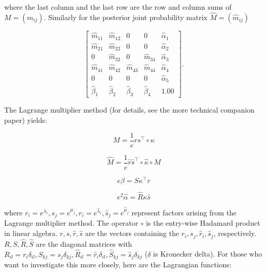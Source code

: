 \documentclass[12pt]{article}
\begin{document}
where the last column and the last row are the row and column sums of
$M=(m_{ij})$. Similarly for the posterior joint probability matrix
$\hat{M}=(\hat{m}_{ij})$

\begin{equation}
  \label{eq:p6}
      \left[
      \begin{array}{ccccc}
        \hat{m}_{11} & \hat{m}_{12} & 0 & 0 & \hat{\alpha}_{1} \\
        \hat{m}_{21} & \hat{m}_{22} & 0 & 0 & \hat{\alpha}_{2} \\
        0 & \hat{m}_{32} & 0 & \hat{m}_{34} & \hat{\alpha}_{3} \\
        \hat{m}_{41} & \hat{m}_{42} & \hat{m}_{43} & \hat{m}_{44} & \hat{\alpha}_{4} \\
        0 & 0 & 0 & 0 & \hat{\alpha}_{5} \\
        \hat{\beta}_{1} & \hat{\beta}_{2} & \hat{\beta}_{3} & \hat{\beta}_{4} & 1.00
      \end{array}
\right].
\end{equation}

The Lagrange multiplier method (for details, see the more technical
companion paper) yields:

\begin{equation}
  \label{eq:m1}
  M=\frac{1}{e}rs^{\intercal}\circ\kappa
\end{equation}

\begin{equation}
  \label{eq:m2}
  \hat{M}=\frac{1}{e}\hat{r}\hat{s}^{\intercal}\circ\hat{\kappa}\circ{}M
\end{equation}



\begin{equation}
  \label{eq:m3}
  e\beta=S\kappa^{\intercal}r
\end{equation}

\begin{equation}
  \label{eq:m4}
  e^{2}\hat{\alpha}=\hat{R}\kappa{}\hat{s}
\end{equation}

where
$r_{i}=e^{\lambda_{i}},s_{j}=e^{\mu_{j}},\hat{r}_{i}=e^{\hat{\lambda}_{i}},\hat{s}_{j}=e^{\hat{\mu}_{j}}$
represent factors arising from the Lagrange multiplier method. The
operator $\circ$ is the entry-wise Hadamard product in linear algebra.
$r,s,\hat{r},\hat{s}$ are the vectors containing the
$r_{i},s_{j},\hat{r}_{i},\hat{s}_{j}$, respectively.
$R,S,\hat{R},\hat{S}$ are the diagonal matrices with
$R_{il}=r_{i}\delta_{il},S_{kj}=s_{j}\delta_{kj},\hat{R}_{il}=\hat{r}_{i}\delta_{il},\hat{S}_{kj}=\hat{s}_{j}\delta_{kj}$
($\delta$ is Kronecker delta). For those who want to investigate this
more closely, here are the Lagrangian functions:
\end{document}
